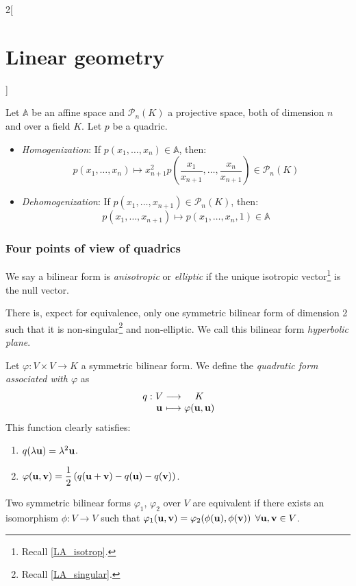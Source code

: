 \documentclass[../../../main.tex]{subfiles}
\begin{document}
\begin{multicols}{2}[\section{Linear geometry}]
  \begin{prop}
    Let $\mathbb{A}$ be an affine space and $\mathcal{P}_n(K)$ a projective space, both of dimension $n$ and over a field $K$. Let $p$ be a quadric.
    \begin{itemize}
      \item\textit{Homogenization}: If $p(x_1,\ldots,x_n)\in\mathbb{A}$, then: $$p(x_1,\ldots,x_n)\mapsto x_{n+1}^2p\left(\frac{x_1}{x_{n+1}},\ldots,\frac{x_n}{x_{n+1}}\right)\in\mathcal{P}_n(K)$$
      \item\textit{Dehomogenization}: If $p(x_1,\ldots,x_{n+1})\in\mathcal{P}_n(K)$, then: $$p(x_1,\ldots,x_{n+1})\mapsto p(x_1,\ldots,x_n,1)\in\mathbb{A}$$
    \end{itemize}
  \end{prop}
  \subsubsection{Four points of view of quadrics}
  \begin{definition}
    We say a bilinear form is \textit{anisotropic} or \textit{elliptic} if the unique isotropic vector\footnote{Recall \cref{LA_isotrop}.} is the null vector.
  \end{definition}
  \begin{theorem}
    There is, expect for equivalence, only one symmetric bilinear form of dimension 2 such that it is non-singular\footnote{Recall \cref{LA_singular}.} and non-elliptic. We call this bilinear form \textit{hyperbolic plane}.
  \end{theorem}
  \begin{definition}
    Let $\varphi:V\times V\rightarrow K$ a symmetric bilinear form. We define the \textit{quadratic form associated with $\varphi$} as
    $$
      \function{q}{V}{K}{\vectorfunction{u}}{\varphi(\vectorfunction{u},\vectorfunction{u})}
    $$
    This function clearly satisfies:
    \begin{enumerate}
      \item $q(\lambda\boldsymbol{\mathrm{u}})=\lambda^2\boldsymbol{\mathrm{u}}$.
      \item $\displaystyle\varphi(\boldsymbol{\mathrm{u}},\boldsymbol{\mathrm{v}})=\frac{1}{2}\left(q(\boldsymbol{\mathrm{u}}+\boldsymbol{\mathrm{v}})-q(\boldsymbol{\mathrm{u}})-q(\boldsymbol{\mathrm{v}})\right)$.
    \end{enumerate}
  \end{definition}
  \begin{prop}
    Two symmetric bilinear forms $\varphi_1$, $\varphi_2$ over $V$ are equivalent if there exists an isomorphism $\phi:V\rightarrow V$ such that $\varphi_1(\boldsymbol{\mathrm{u}},\boldsymbol{\mathrm{v}})=\varphi_2(\phi(\boldsymbol{\mathrm{u}}),\phi(\boldsymbol{\mathrm{v}}))$ $\forall\boldsymbol{\mathrm{u}},\boldsymbol{\mathrm{v}}\in V$.\newline

\end{prop}
\end{multicols}
\end{document}
